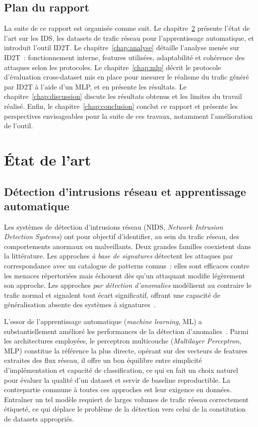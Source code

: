\documentclass[12pt, a4paper]{report}
\begin{document}
\section{Plan du rapport}
 
La suite de ce rapport est organisée comme suit.
Le chapitre~\ref{chap:etat_art} présente l'état de l'art sur les IDS, les datasets de trafic réseau pour
l'apprentissage automatique, et introduit l'outil ID2T.
Le chapitre~\ref{chap:analyse} détaille l'analyse menée sur ID2T~: fonctionnement interne, features
utilisées, adaptabilité et cohérence des attaques selon les protocoles.
Le chapitre~\ref{chap:mlp} décrit le protocole d'évaluation cross-dataset mis en place pour mesurer le réalisme du trafic généré par ID2T à l'aide d'un MLP, et en présente les résultats.
Le chapitre~\ref{chap:discussion} discute les résultats obtenus et les limites du travail réalisé.
Enfin, le chapitre~\ref{chap:conclusion} conclut ce rapport et présente les perspectives envisageables
pour la suite de ces travaux, notamment l'amélioration de l'outil.
 
 
\chapter{État de l'art}
\label{chap:etat_art}
 
\section{Détection d'intrusions réseau et apprentissage automatique}
 
Les systèmes de détection d'intrusions réseau (NIDS, \textit{Network Intrusion Detection Systems})
ont pour objectif d'identifier, au sein du trafic réseau, des comportements anormaux ou malveillants.
Deux grandes familles coexistent dans la littérature.
Les approches \textit{à base de signatures} détectent les attaques par correspondance avec un catalogue
de patterns connus~: elles sont efficaces contre les menaces répertoriées mais échouent dès qu'un
attaquant modifie légèrement son approche.
Les approches \textit{par détection d'anomalies} modélisent au contraire le trafic normal et signalent
tout écart significatif, offrant une capacité de généralisation absente des systèmes à
signatures~\cite{sharafaldin2018}.
 
L'essor de l'apprentissage automatique (\textit{machine learning}, ML) a substantiellement amélioré
les performances de la détection d'anomalies~\cite{survey2026}. Parmi les architectures employées,
le perceptron multicouche (\textit{Multilayer Perceptron}, MLP) constitue la référence la plus
directe, opérant sur des vecteurs de features extraites des flux réseau, il offre un bon équilibre
entre simplicité d'implémentation et capacité de classification, ce qui en fait un choix naturel pour
évaluer la qualité d'un dataset et servir de baseline reproductible. La contrepartie commune à toutes
ces approches est leur exigence en données. Entraîner un tel modèle requiert de larges volumes de
trafic réseau correctement étiqueté, ce qui déplace le problème de la détection vers celui de la
constitution de datasets appropriés.
 
\end{document}
